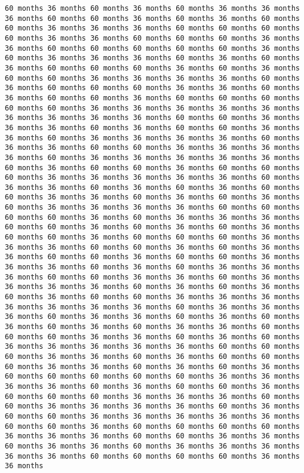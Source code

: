 \documentclass[11pt]{article}
\begin{document}
\begin{Verbatim}[commandchars=\\\{\}, frame=single, framerule=2mm, rulecolor=\color{outerrorbackground}]
60 months 36 months 60 months 36 months 60 months 36 months 36 months 36 months 60 months 60 months 36 months 60 months 36 months 60 months 60 months 36 months 36 months 36 months 60 months 60 months 60 months 60 months 36 months 36 months 60 months 60 months 60 months 36 months 36 months 60 months 60 months 60 months 60 months 60 months 36 months 60 months 36 months 36 months 36 months 60 months 36 months 60 months 36 months 60 months 60 months 60 months 36 months 60 months 36 months 60 months 60 months 36 months 36 months 36 months 36 months 60 months 36 months 60 months 60 months 60 months 36 months 36 months 60 months 36 months 60 months 60 months 36 months 60 months 60 months 60 months 60 months 60 months 36 months 36 months 36 months 36 months 36 months 36 months 36 months 36 months 36 months 60 months 60 months 36 months 36 months 36 months 60 months 36 months 60 months 60 months 36 months 36 months 60 months 36 months 36 months 36 months 36 months 60 months 36 months 36 months 60 months 60 months 36 months 36 months 36 months 36 months 60 months 36 months 36 months 36 months 36 months 36 months 60 months 36 months 60 months 60 months 36 months 60 months 60 months 60 months 36 months 36 months 36 months 36 months 36 months 60 months 36 months 36 months 60 months 36 months 60 months 36 months 60 months 60 months 36 months 36 months 60 months 36 months 60 months 36 months 60 months 36 months 36 months 36 months 36 months 60 months 60 months 60 months 60 months 36 months 60 months 36 months 36 months 36 months 60 months 60 months 36 months 60 months 36 months 60 months 36 months 60 months 60 months 36 months 60 months 60 months 60 months 36 months 36 months 36 months 60 months 60 months 36 months 60 months 36 months 36 months 60 months 60 months 36 months 60 months 60 months 36 months 36 months 36 months 60 months 36 months 60 months 36 months 36 months 36 months 60 months 60 months 36 months 36 months 60 months 36 months 36 months 36 months 36 months 60 months 36 months 60 months 36 months 60 months 36 months 60 months 60 months 36 months 36 months 36 months 36 months 36 months 36 months 36 months 60 months 36 months 36 months 36 months 60 months 36 months 36 months 60 months 36 months 60 months 36 months 60 months 36 months 60 months 36 months 36 months 60 months 60 months 60 months 36 months 36 months 60 months 36 months 60 months 36 months 36 months 36 months 36 months 36 months 60 months 60 months 60 months 36 months 36 months 60 months 36 months 60 months 60 months 60 months 36 months 36 months 60 months 36 months 60 months 36 months 60 months 60 months 60 months 60 months 60 months 36 months 36 months 36 months 36 months 60 months 36 months 60 months 60 months 36 months 60 months 60 months 60 months 36 months 36 months 36 months 60 months 60 months 36 months 36 months 36 months 36 months 60 months 36 months 60 months 60 months 36 months 36 months 36 months 36 months 36 months 60 months 60 months 36 months 60 months 60 months 60 months 60 months 36 months 36 months 36 months 60 months 60 months 36 months 36 months 60 months 36 months 36 months 60 months 36 months 36 months 36 months 36 months 36 months 60 months 60 months 60 months 60 months 36 months 36 months 
\end{Verbatim}
\end{document}
